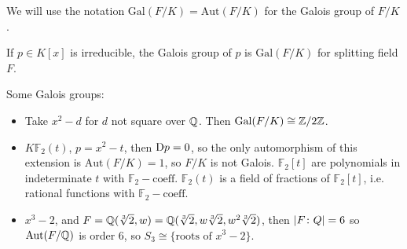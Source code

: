 \documentclass[a4paper,twoside,master.tex]{subfiles}
\begin{document}
We will use the notation $ \text{Gal}(F/K) = \text{Aut}(F/K) $ for the Galois group of $ F/K $.

If $ p \in K[x] $ is irreducible, the Galois group of $ p $ is $ \text{Gal}(F/K) $ for splitting field $ F $.


\begin{ex}
Some Galois groups:
    \begin{itemize}
        \item Take $ x^2 - d $ for $ d $ not square over $ \mathbb{Q} $. Then $ \text{Gal}(F/K) \cong \mathbb{Z}/2\mathbb{Z} $.
        \item $ K \mathbb{F}_2(t)$, $ p = x^2 - t $, then $ \mathrm{D} p = 0 $, so the only automorphism of this extension is $ \text{Aut}(F/K) = 1 $, so $ F/K $ is not Galois.
            $ \mathbb{F}_2[t] $ are polynomials in indeterminate $ t $ with $ \mathbb{F}_2 - \text{coeff} $. $ \mathbb{F}_2(t) $ is a field of fractions of $ \mathbb{F}_2[t] $, i.e. rational functions with $ \mathbb{F}_2 - \text{coeff} $.
        \item $ x^3 - 2 $, and $ F = \mathbb{Q}(\sqrt[3]{2}, w) = \mathbb{Q}(\sqrt[3]{2}, w\sqrt[3]{2}, w^2 \sqrt[3]{2}) $, then $ \abs{F\colon Q} = 6 $ so $ \text{Aut}(F/\mathbb{Q}) $ is order $ 6 $, so $ S_3 \cong \{\text{roots of } x^3 - 2\} $.
    \end{itemize}
\end{ex}
\end{document}
